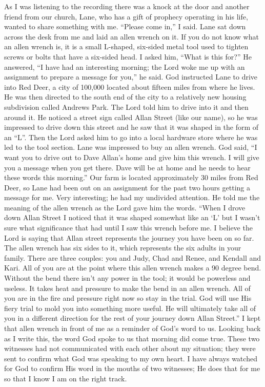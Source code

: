 \documentclass[twoside, 12pt]{book}
\begin{document}
As I was listening to the recording there was a knock at the door and another friend from our church, Lane, who has a gift of prophecy operating in his life, wanted to share something with me. “Please come in,” I said. Lane sat down across the desk from me and laid an allen wrench on it. If you do not know what an allen wrench is, it is a small L-shaped, six-sided metal tool used to tighten screws or bolts that have a six-sided head. I asked him, “What is this for?” He answered, “I have had an interesting morning; the Lord woke me up with an assignment to prepare a message for you,” he said. God instructed Lane to drive into Red Deer, a city of 100,000 located about fifteen miles from where he lives. He was then directed to the south end of the city to a relatively new housing subdivision called Andrews Park. The Lord told him to drive into it and then around it. He noticed a street sign called Allan Street (like our name), so he was impressed to drive down this street and he saw that it was shaped in the form of an “L”. Then the Lord asked him to go into a local hardware store where he was led to the tool section. Lane was impressed to buy an allen wrench. God said, “I want you to drive out to Dave Allan's home and give him this wrench. I will give you a message when you get there. Dave will be at home and he needs to hear these words this morning.” Our farm is located approximately 30 miles from Red Deer, so Lane had been out on an assignment for the past two hours getting a message for me. Very interesting; he had my undivided attention. He told me the meaning of the allen wrench as the Lord gave him the words. “When I drove down Allan Street I noticed that it was shaped somewhat like an ‘L’ but I wasn't sure what significance that had until I saw this wrench before me. I believe the Lord is saying that Allan street represents the journey you have been on so far. The allen wrench has six sides to it, which represents the six adults in your family. There are three couples: you and Judy, Chad and Renee, and Kendall and Kari. All of you are at the point where this allen wrench makes a 90 degree bend. Without the bend there isn’t any power in the tool; it would be powerless and useless. It takes heat and pressure to make the bend in an allen wrench. All of you are in the fire and pressure right now so stay in the trial. God will use His fiery trial to mold you into something more useful. He will ultimately take all of you in a different direction for the rest of your journey down Allan Street.” I kept that allen wrench in front of me as a reminder of God's word to us. Looking back as I write this, the word God spoke to us that morning did come true. These two witnesses had not communicated with each other about my situation; they were sent to confirm what God was speaking to my own heart. I have always watched for God to confirm His word in the mouths of two witnesses; He does that for me so that I know I am on the right track.
\end{document}
